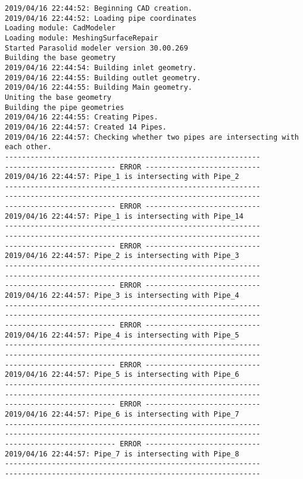 \documentclass{article}
\begin{document}
{\tiny 
\begin{verbatim}
2019/04/16 22:44:52: Beginning CAD creation.
2019/04/16 22:44:52: Loading pipe coordinates
Loading module: CadModeler
Loading module: MeshingSurfaceRepair
Started Parasolid modeler version 30.00.269
Building the base geometry
2019/04/16 22:44:54: Building inlet geometry.
2019/04/16 22:44:55: Building outlet geometry.
2019/04/16 22:44:55: Building Main geometry.
Uniting the base geometry
Building the pipe geometries
2019/04/16 22:44:55: Creating Pipes.
2019/04/16 22:44:57: Created 14 Pipes.
2019/04/16 22:44:57: Checking whether two pipes are intersecting with each other.
------------------------------------------------------------
-------------------------- ERROR ---------------------------
2019/04/16 22:44:57: Pipe_1 is intersecting with Pipe_2
------------------------------------------------------------
------------------------------------------------------------
-------------------------- ERROR ---------------------------
2019/04/16 22:44:57: Pipe_1 is intersecting with Pipe_14
------------------------------------------------------------
------------------------------------------------------------
-------------------------- ERROR ---------------------------
2019/04/16 22:44:57: Pipe_2 is intersecting with Pipe_3
------------------------------------------------------------
------------------------------------------------------------
-------------------------- ERROR ---------------------------
2019/04/16 22:44:57: Pipe_3 is intersecting with Pipe_4
------------------------------------------------------------
------------------------------------------------------------
-------------------------- ERROR ---------------------------
2019/04/16 22:44:57: Pipe_4 is intersecting with Pipe_5
------------------------------------------------------------
------------------------------------------------------------
-------------------------- ERROR ---------------------------
2019/04/16 22:44:57: Pipe_5 is intersecting with Pipe_6
------------------------------------------------------------
------------------------------------------------------------
-------------------------- ERROR ---------------------------
2019/04/16 22:44:57: Pipe_6 is intersecting with Pipe_7
------------------------------------------------------------
------------------------------------------------------------
-------------------------- ERROR ---------------------------
2019/04/16 22:44:57: Pipe_7 is intersecting with Pipe_8
------------------------------------------------------------
------------------------------------------------------------

\end{verbatim}}
\end{document}
